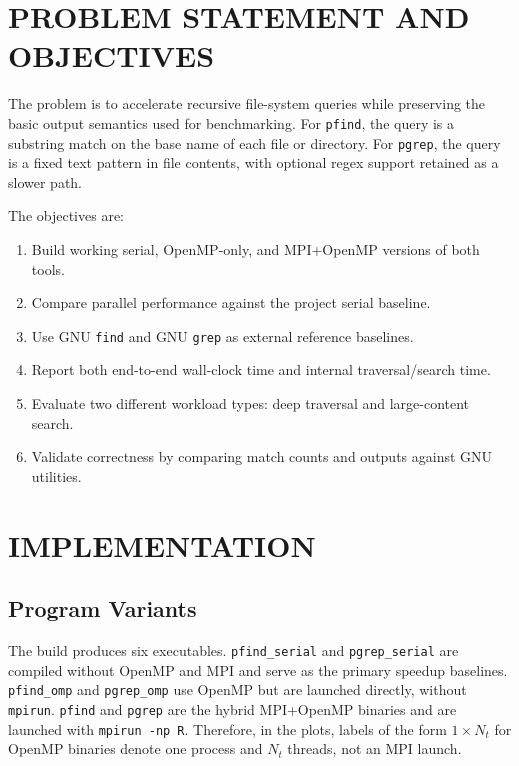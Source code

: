 \documentclass[twocolumn,10pt]{asme2e}
\begin{document}
\section*{PROBLEM STATEMENT AND OBJECTIVES}

The problem is to accelerate recursive file-system queries while preserving the basic output semantics used for benchmarking. For \texttt{pfind}, the query is a substring match on the base name of each file or directory. For \texttt{pgrep}, the query is a fixed text pattern in file contents, with optional regex support retained as a slower path.

The objectives are:

\begin{enumerate}
\item Build working serial, OpenMP-only, and MPI+OpenMP versions of both tools.
\item Compare parallel performance against the project serial baseline.
\item Use GNU \texttt{find} and GNU \texttt{grep} as external reference baselines.
\item Report both end-to-end wall-clock time and internal traversal/search time.
\item Evaluate two different workload types: deep traversal and large-content search.
\item Validate correctness by comparing match counts and outputs against GNU utilities.
\end{enumerate}

\section*{IMPLEMENTATION}

\subsection*{Program Variants}

The build produces six executables. \texttt{pfind\_serial} and \texttt{pgrep\_serial} are compiled without OpenMP and MPI and serve as the primary speedup baselines. \texttt{pfind\_omp} and \texttt{pgrep\_omp} use OpenMP but are launched directly, without \texttt{mpirun}. \texttt{pfind} and \texttt{pgrep} are the hybrid MPI+OpenMP binaries and are launched with \texttt{mpirun -np R}. Therefore, in the plots, labels of the form $1\times N_t$ for OpenMP binaries denote one process and $N_t$ threads, not an MPI launch.
\end{document}
